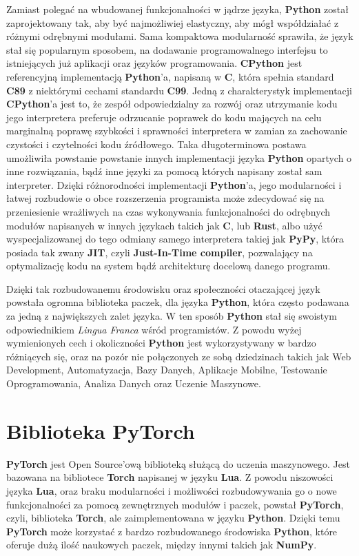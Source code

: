 Zamiast polegać na wbudowanej funkcjonalności w jądrze języka, \textbf{Python} został zaprojektowany tak, aby być najmożliwiej elastyczny, aby mógł współdziałać z różnymi odrębnymi modułami. Sama kompaktowa modularność sprawiła, że język stał się popularnym sposobem, na dodawanie programowalnego interfejsu to istniejących już aplikacji oraz języków programowania.
\textbf{CPython} jest referencyjną implementacją \textbf{Python}'a, napisaną w \textbf{C}, która spełnia standard \textbf{C89} z niektórymi cechami standardu \textbf{C99}. Jedną z charakterystyk implementacji \textbf{CPython}'a jest to, że zespół odpowiedzialny za rozwój oraz utrzymanie kodu jego interpretera preferuje odrzucanie poprawek do kodu mających na celu marginalną poprawę szybkości i sprawności interpretera w zamian za zachowanie czystości i czytelności kodu źródłowego. Taka długoterminowa postawa umożliwiła powstanie powstanie innych implementacji języka \textbf{Python} opartych o inne rozwiązania, bądź inne języki za pomocą których napisany został sam interpreter. Dzięki różnorodności implementacji \textbf{Python}'a, jego modularności i łatwej rozbudowie o obce rozszerzenia programista może zdecydować się na przeniesienie wrażliwych na czas wykonywania funkcjonalności do odrębnych modułów napisanych w innych językach takich jak \textbf{C}, lub \textbf{Rust}, albo użyć wyspecjalizowanej do tego odmiany samego interpretera takiej jak \textbf{PyPy}, która posiada tak zwany \textbf{JIT}, czyli \textbf{Just-In-Time compiler}, pozwalający na optymalizację kodu na system bądź architekturę docelową danego programu.

Dzięki tak rozbudowanemu środowisku oraz społeczności otaczającej język powstała ogromna biblioteka paczek, dla języka \textbf{Python}, która często podawana za jedną z największych zalet języka. W ten sposób \textbf{Python} stał się swoistym odpowiednikiem \textit{Lingua Franca} wśród programistów. Z powodu wyżej wymienionych cech i okoliczności \textbf{Python} jest wykorzystywany w bardzo różniących się, oraz na pozór nie połączonych ze sobą dziedzinach takich jak Web Development, Automatyzacja, Bazy Danych, Aplikacje Mobilne, Testowanie Oprogramowania, Analiza Danych oraz Uczenie Maszynowe.



\section{Biblioteka PyTorch}

\textbf{PyTorch} \cite{PyTorchWebSite} \cite{DeepLearningWithPyTorch} \cite{ProgrammingPyTorchForDeepLearning} \cite{PyTorchPocketReference} jest Open Source'ową biblioteką służącą do uczenia maszynowego. Jest bazowana na bibliotece \textbf{Torch} napisanej w języku \textbf{Lua}. Z powodu niszowości języka \textbf{Lua}, oraz braku modularności i możliwości rozbudowywania go o nowe funkcjonalności za pomocą zewnętrznych modułów i paczek, powstał \textbf{PyTorch}, czyli, biblioteka \textbf{Torch}, ale zaimplementowana w języku \textbf{Python}. Dzięki temu \textbf{PyTorch} może korzystać z bardzo rozbudowanego środowiska \textbf{Python}, które oferuje dużą ilość naukowych paczek, między innymi takich jak \textbf{NumPy}.


